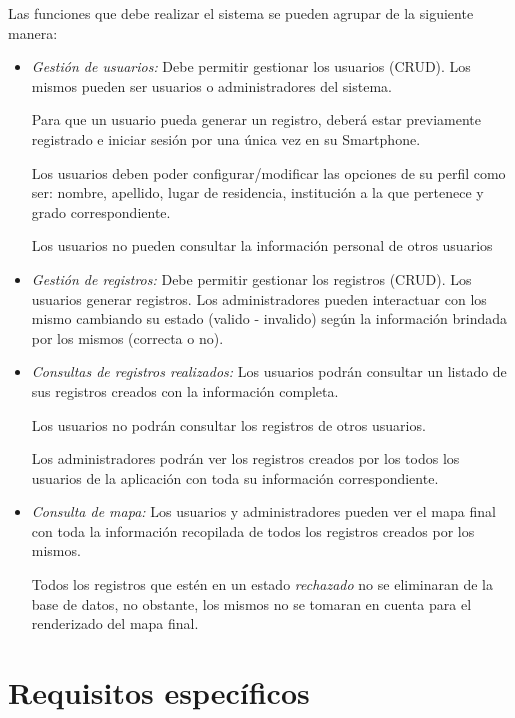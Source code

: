 Las funciones que debe realizar el sistema se pueden agrupar de la siguiente manera:

  \begin{itemize}
  
  \item \emph{Gestión de usuarios:} Debe permitir gestionar los usuarios (CRUD). Los mismos pueden ser usuarios o administradores del sistema.
    
    Para que un usuario pueda generar un registro, deberá estar previamente registrado e iniciar sesión por una única vez en su Smartphone.
    
    Los usuarios deben poder configurar/modificar las opciones de su perfil como ser: nombre, apellido, lugar de residencia, institución a la que pertenece y grado correspondiente.

    Los usuarios no pueden consultar la información personal de otros usuarios
  
  \item \emph{Gestión de registros:} Debe permitir gestionar los registros (CRUD). Los usuarios generar registros. Los administradores pueden interactuar con los mismo cambiando su estado (valido - invalido) según la información brindada por los mismos (correcta o no).
  
  \item \emph{Consultas de registros realizados:} Los usuarios podrán consultar un listado de sus registros creados con la información completa.
  
  Los usuarios no podrán consultar los registros de otros usuarios.

  Los administradores podrán ver los registros creados por los todos los usuarios de la aplicación con toda su información correspondiente.

  \item \emph{Consulta de mapa:} Los usuarios y administradores pueden ver el mapa final con toda la información recopilada de todos los registros creados por los mismos.

  Todos los registros que estén en un estado \emph{rechazado} no se eliminaran de la base de datos, no obstante, los mismos no se tomaran en cuenta para el renderizado del mapa final. 
  
  \end{itemize}

 \section{Requisitos específicos}
 
